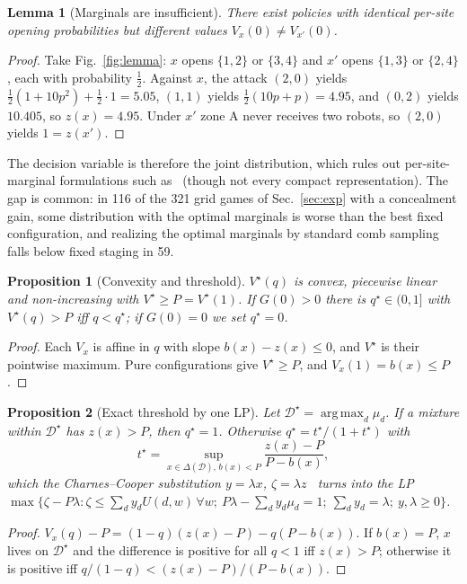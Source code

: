 \documentclass[letterpaper,journal]{IEEEtran}
\newtheorem{lemma}{Lemma}
\newtheorem{proposition}{Proposition}
\theoremstyle{remark}
\newcommand{\D}{\mathcal{D}}
\DeclareMathOperator*{\argmax}{arg\,max}
\begin{document}
\begin{lemma}[Marginals are insufficient]\label{lem:marg}
There exist policies with identical per-site opening probabilities but different values $V_x(0)\neq V_{x'}(0)$.
\end{lemma}
\begin{proof}
Take Fig.~\ref{fig:lemma}: $x$ opens $\{1,2\}$ or $\{3,4\}$ and $x'$ opens $\{1,3\}$ or $\{2,4\}$, each with probability $\tfrac12$. Against $x$, the attack $(2,0)$ yields $\tfrac12(1+10p^2)+\tfrac12\cdot1=5.05$, $(1,1)$ yields $\tfrac12(10p+p)=4.95$, and $(0,2)$ yields $10.405$, so $z(x)=4.95$. Under $x'$ zone A never receives two robots, so $(2,0)$ yields $1=z(x')$.
\end{proof}
The decision variable is therefore the joint distribution, which rules out per-site-marginal formulations such as~\cite{xu2015leak} (though not every compact representation). The gap is common: in 116 of the 321 grid games of Sec.~\ref{sec:exp} with a concealment gain, some distribution with the optimal marginals is worse than the best fixed configuration, and realizing the optimal marginals by standard comb sampling falls below fixed staging in 59.

\begin{proposition}[Convexity and threshold]\label{prop:convex}
$V^\star(q)$ is convex, piecewise linear and non-increasing with $V^\star\ge P=V^\star(1)$. If $G(0)>0$ there is $q^\star\in(0,1]$ with $V^\star(q)>P$ iff $q<q^\star$; if $G(0)=0$ we set $q^\star=0$.
\end{proposition}
\begin{proof}
Each $V_x$ is affine in $q$ with slope $b(x)-z(x)\le0$, and $V^\star$ is their pointwise maximum. Pure configurations give $V^\star\ge P$, and $V_x(1)=b(x)\le P$.
\end{proof}

\begin{proposition}[Exact threshold by one LP]\label{prop:qstar}
Let $\D^\star=\argmax_d\mu_d$. If a mixture within $\D^\star$ has $z(x)>P$, then $q^\star=1$. Otherwise $q^\star=t^\star/(1+t^\star)$ with
\begin{equation}\label{eq:frac}
t^\star=\sup_{x\in\Delta(\D),\,b(x)<P}\frac{z(x)-P}{P-b(x)},
\end{equation}
which the Charnes--Cooper substitution $y=\lambda x$, $\zeta=\lambda z$~\cite{charnes1962} turns into the LP $\max\{\zeta-P\lambda:\zeta\le\sum_d y_dU(d,w)\,\forall w;\ P\lambda-\sum_d y_d\mu_d=1;\ \sum_dy_d=\lambda;\ y,\lambda\ge0\}$.
\end{proposition}
\begin{proof}
$V_x(q)-P=(1-q)(z(x)-P)-q(P-b(x))$. If $b(x)=P$, $x$ lives on $\D^\star$ and the difference is positive for all $q<1$ iff $z(x)>P$; otherwise it is positive iff $q/(1-q)<(z(x)-P)/(P-b(x))$.
\end{proof}
\end{document}

